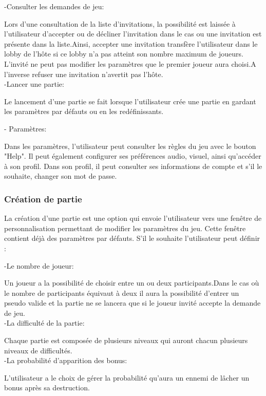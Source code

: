 \documentclass[a4paper,12pt]{article}
\begin{document}
-Consulter les demandes de jeu:

Lors d’une consultation de la liste d’invitations, la possibilité est laissée à l’utilisateur d’accepter ou de décliner l’invitation dans le cas ou une invitation est présente dans la liste.Ainsi, accepter une invitation transfère l’utilisateur dans le lobby de l’hôte si ce lobby n’a pas atteint son nombre maximum de joueurs. L’invité ne peut pas modifier les paramètres que le premier joueur aura choisi.A l’inverse refuser une invitation n’avertit pas l’hôte. \\

-Lancer une partie:

Le lancement d’une partie se fait lorsque l’utilisateur crée une partie en gardant les paramètres par défauts ou en les redéfinissants.

- Paramètres:

Dans les paramètres, l'utilisateur peut consulter les règles du jeu avec le bouton "Help". Il peut également configurer ses préférences audio, visuel, ainsi qu'accéder à son profil. Dans son profil, il peut consulter ses informations de compte et s'il le souhaite, changer son mot de passe.

\subsubsection{Création de partie}
La création d'une partie est une option qui envoie l'utilisateur vers une fenêtre de personnalisation permettant de modifier les paramètres du jeu.
Cette fenêtre contient déjà des paramètres par défauts.
S'il le souhaite l'utilisateur peut définir :

-Le nombre de joueur: 

Un joueur a la possibilité de choisir entre un ou deux participants.Dans le cas où le nombre de participants équivaut à deux il aura la possibilité d'entrer un pseudo valide et la partie ne se lancera que si le joueur invité accepte la demande de jeu. \\

-La difficulté de la partie: 

Chaque partie est composée de plusieurs niveaux qui auront chacun plusieurs niveaux de difficultés.  \\

-La probabilité d'apparition des bonus:

L'utilisateur a le choix de gérer la probabilité qu'aura un ennemi de lâcher un bonus après sa destruction. \\
\end{document}
